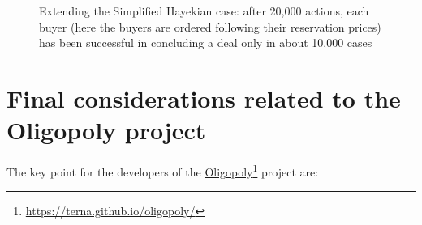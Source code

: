 \documentclass[10pt]{report}
\begin{document}
\begin{appendices}
\begin{figure}[H]
\begin{center}
\caption{Extending the Simplified Hayekian case: after 20,000 actions, each buyer (here the buyers are ordered  following their reservation prices) has been successful in concluding a deal only in about 10,000 cases}
\label{output_4_0B2.png}
\end{center}
\end{figure}

\section{Final considerations related to the Oligopoly project}

The key point for the developers of the \href{https://terna.github.io/oligopoly/}{Oligopoly}\footnote{\url{https://terna.github.io/oligopoly/}} project are:

\end{appendices}

\clearpage
{}




\clearpage
{}
\printindex
\end{document}

